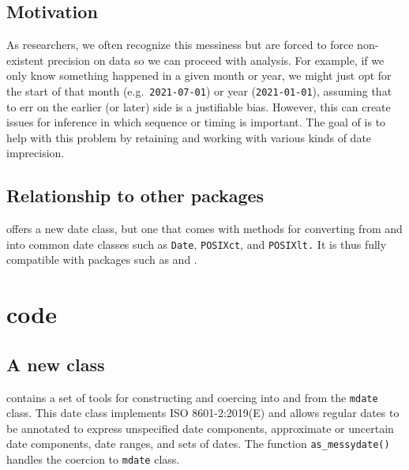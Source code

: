 \documentclass[
]{jss}
\begin{document}
\hypertarget{motivation}{%
\subsection{Motivation}\label{motivation}}

As researchers, we often recognize this messiness but are forced to
force non-existent precision on data so we can proceed with analysis.
For example, if we only know something happened in a given month or
year, we might just opt for the start of that month
(e.g.~\texttt{2021-07-01}) or year (\texttt{2021-01-01}), assuming that
to err on the earlier (or later) side is a justifiable bias. However,
this can create issues for inference in which sequence or timing is
important. The goal of  is to help with this problem by
retaining and working with various kinds of date imprecision.

\hypertarget{relationship-to-other-packages}{%
\subsection{Relationship to other
packages}\label{relationship-to-other-packages}}

 offers a new date class, but one that comes with
methods for converting from and into common date classes such as
\texttt{Date}, \texttt{POSIXct}, and \texttt{POSIXlt.} It is thus fully
compatible with packages such as 
\citep{grolemundDatesTimesMade2011} and 
\citep{eddelbuettelAnytimeEasierDate2019}.

\section[R code]{ code}\label{r-code}

\hypertarget{a-new-class}{%
\subsection{A new class}\label{a-new-class}}

 contains a set of tools for constructing and coercing
into and from the \texttt{mdate} class. This date class implements ISO
8601-2:2019(E) and allows regular dates to be annotated to express
unspecified date components, approximate or uncertain date components,
date ranges, and sets of dates. The function \texttt{as\_messydate()}
handles the coercion to \texttt{mdate} class.
\end{document}
